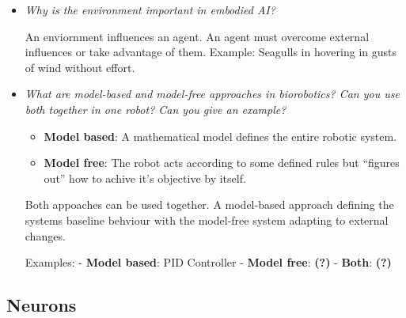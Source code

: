 \documentclass[
    fontsize      = 11pt,
    paper         = a4,
    twoside       = false,
    parskip       = half,
    pagesize      = false,
]{scrartcl}
\providecommand{\tightlist}{%
  \setlength{\itemsep}{0pt}\setlength{\parskip}{0pt}}
\begin{document}
\begin{itemize}
  \textbf{(?)}
\item
  \emph{Why is the environment important in embodied AI?}

  An enviornment influences an agent. An agent must overcome external
  influences or take advantage of them. Example: Seagulls in hovering in
  gusts of wind without effort.
\item
  \emph{What are model-based and model-free approaches in biorobotics?
  Can you use both together in one robot? Can you give an example?}

  \begin{itemize}
  \tightlist
  \item
    \textbf{Model based}: A mathematical model defines the entire
    robotic system.
  \item
    \textbf{Model free}: The robot acts according to some defined rules
    but ``figures out'' how to achive it's objective by itself.
  \end{itemize}

  Both appoaches can be used together. A model-based approach defining
  the systems baseline behviour with the model-free system adapting to
  external changes.

  Examples: - \textbf{Model based}: PID Controller - \textbf{Model
  free}: \textbf{(?)} - \textbf{Both}: \textbf{(?)}
\end{itemize}

\hypertarget{neurons}{%
\subsection{Neurons}\label{neurons}}
\end{document}
